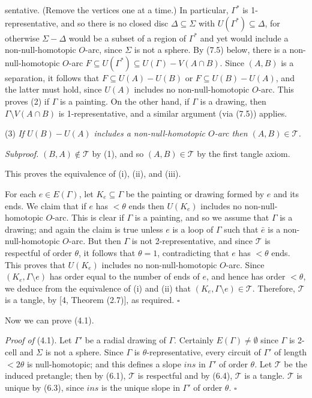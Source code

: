 \noindent sentative. (Remove the vertices one at a time.) In particular, $\Gamma^*$ is 1-representative, and so there is no closed disc $\Delta \subseteq \Sigma$ with $U(\Gamma^*) \subseteq \Delta$, for otherwise $\Sigma - \Delta$ would be a subset of a region of $\Gamma^*$ and yet would include a non-null-homotopic $O$-arc, since $\Sigma$ is not a sphere. By (7.5) below, there is a non-null-homotopic $O$-arc $F \subseteq U(\Gamma^*) \subseteq U(\Gamma) - V(A \cap B)$. Since $(A, B)$ is a separation, it follows that $F \subseteq U(A) - U(B)$ or $F \subseteq U(B) - U(A)$, and the latter must hold, since $U(A)$ includes no non-null-homotopic $O$-arc. This proves (2) if $\Gamma$ is a painting. On the other hand, if $\Gamma$ is a drawing, then $\Gamma \setminus V(A \cap B)$ is 1-representative, and a similar argument (via (7.5)) applies.

\hspace*{12pt}(3) \textit{If $U(B) - U(A)$ includes a non-null-homotopic $O$-arc then $(A, B) \in \mathscr{T}$.}

\textit{Subproof.} $(B, A) \notin \mathscr{T}$ by (1), and so $(A, B) \in \mathscr{T}$ by the first tangle axiom.

This proves the equivalence of (i), (ii), and (iii).

For each $e \in E(\Gamma)$, let $K_e \subseteq \Gamma$ be the painting or drawing formed by $e$ and its ends. We claim that if $e$ has $< \theta$ ends then $U(K_e)$ includes no non-null-homotopic $O$-arc. This is clear if $\Gamma$ is a painting, and so we assume that $\Gamma$ is a drawing; and again the claim is true unless $e$ is a loop of $\Gamma$ such that $\bar{e}$ is a non-null-homotopic $O$-arc. But then $\Gamma$ is not 2-representative, and since $\mathscr{T}$ is respectful of order $\theta$, it follows that $\theta = 1$, contradicting that $e$ has $< \theta$ ends. This proves that $U(K_e)$ includes no non-null-homotopic $O$-arc. Since $(K_e, \Gamma \setminus e)$ has order equal to the number of ends of $e$, and hence has order $< \theta$, we deduce from the equivalence of (i) and (ii) that $(K_e, \Gamma \setminus e) \in \mathscr{T}$. Therefore, $\mathscr{T}$ is a tangle, by [4, Theorem (2.7)], as required. $\square$

Now we can prove (4.1).

\textit{Proof of} (4.1). Let $\Gamma'$ be a radial drawing of $\Gamma$. Certainly $E(\Gamma) \ne \emptyset$ since $\Gamma$ is 2-cell and $\Sigma$ is not a sphere. Since $\Gamma$ is $\theta$-representative, every circuit of $\Gamma'$ of length $< 2\theta$ is null-homotopic; and this defines a slope $ins$ in $\Gamma'$ of order $\theta$. Let $\mathscr{T}$ be the induced pretangle; then by (6.1), $\mathscr{T}$ is respectful and by (6.4), $\mathscr{T}$ is a tangle. $\mathscr{T}$ is unique by (6.3), since $ins$ is the unique slope in $\Gamma'$ of order $\theta$. $\square$

